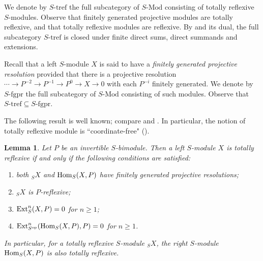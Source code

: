 \documentclass[a4paper]{amsart}
\newtheorem{lem}[thm]{Lemma}
\theoremstyle{definition}
\theoremstyle{remark}
\numberwithin{equation}{section}
\begin{document}
We denote by $S\mbox{-tref}$ the full subcategory of $S\mbox{-Mod}$ consisting of totally reflexive $S$-modules.
Observe that finitely generated projective modules are totally reflexive, and that totally reflexive modules
are reflexive. By \cite[Proposition 5.1]{AR} and its dual, the full subcategory $S\mbox{-tref}$ is closed under finite direct sums, direct summands and extensions.

 Recall that a left $S$-module $X$ is said to have  a \emph{finitely generated projective resolution} provided that there is a projective resolution $\cdots \rightarrow P^{-2}\rightarrow P^{-1}\rightarrow P^0\rightarrow X\rightarrow 0$ with each $P^{-i}$ finitely generated. We denote by $S\mbox{-fgpr}$ the full subcategory of $S\mbox{-Mod}$ consisting of such modules. Observe that $S\mbox{-tref}\subseteq S\mbox{-fgpr}$.

The following result is well known; compare \cite[(3.8)]{ABr} and \cite{EJ1}. In particular, the notion of
totally reflexive module is ``coordinate-free" (\cite[4.2]{Buc}).

\begin{lem}\label{lem:totally}
Let $P$ be an invertible $S$-bimodule. Then a left $S$-module $X$ is totally reflexive if and only if the following conditions are satisfied:
\begin{enumerate}
\item both $_SX$ and  ${\rm Hom}_S(X, P)$ have finitely generated projective resolutions;
\item $_SX$ is $P$-reflexive;
\item ${\rm Ext}^n_S(X, P)=0$ for $n\geq 1$;
\item ${\rm Ext}^n_{S^{\rm op}}({\rm Hom}_S(X, P), P)=0$ for $n\geq 1$.
\end{enumerate}
In particular, for a totally reflexive $S$-module $_SX$, the right $S$-module ${\rm Hom}_S(X, P)$  is also totally reflexive.
\end{lem}
\end{document}
